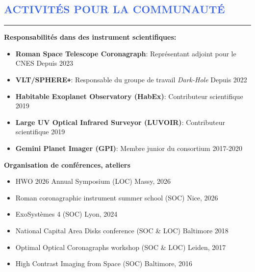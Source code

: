\documentclass[11pt, a4paper, french]{article}
\begin{document}
\lfoot{}


\vspace{-0.5cm}
\textcolor{RoyalBlue}{\section{\large ACTIVITÉS POUR LA COMMUNAUTÉ}
\vspace{-0.2cm}\hrule}
\vspace{0.25cm}

\textbf{Responsabilités dans des instrument scientifiques:}
\begin{itemize} \itemsep -2pt
    \item[$\bullet$] \textbf{Roman Space Telescope Coronagraph}: Représentant adjoint pour le CNES \hfill Depuis 2023
    \item[$\bullet$] \textbf{VLT/SPHERE\texttt{+}}: Responsable du groupe de travail \textit{Dark-Hole} \hfill Depuis 2022
    \item[$\bullet$] \textbf{Habitable Exoplanet Observatory (HabEx)}: Contributeur scientifique  \hfill  2019
    \item[$\bullet$] \textbf{Large UV Optical Infrared Surveyor (LUVOIR)}: Contributeur scientifique \hfill 2019
    \item[$\bullet$] \textbf{Gemini Planet Imager (GPI)}: Membre junior du consortium \hfill 2017-2020
\end{itemize}

\vspace{0.1cm}
\textbf{Organisation de conférences, ateliers}
\vspace{-0.1cm}
\begin{itemize} \itemsep -2pt
    \item[$\bullet$] HWO 2026 Annual Symposium (LOC) \hfill  Massy, 2026
    \item[$\bullet$] Roman coronagraphic instrument summer school (SOC) \hfill  Nice, 2026
    \item[$\bullet$] ExoSystèmes 4 (SOC) \hfill Lyon, 2024 
    \item[$\bullet$] National Capital Area Disks conference (SOC \& LOC) \hfill Baltimore 2018
    \item[$\bullet$] Optimal Optical Coronagraphs workshop (SOC \& LOC) \hfill  Leiden, 2017
    \item[$\bullet$] High Contrast Imaging from Space (SOC) \hfill  Baltimore, 2016
\end{itemize}
\end{document}
